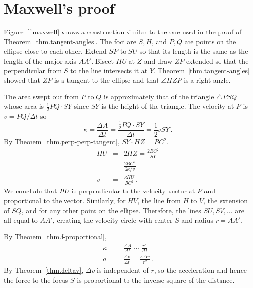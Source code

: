 
\section{Maxwell's proof}

Figure~\ref{f.maxwell} shows a construction similar to the one used in the proof of Theorem~\ref{thm.tangent-angles}. The foci are $S,H$, and $P,Q$ are points on the ellipse close to each other. Extend $SP$ to $SU$ so that its length is the same as the length of the major axis $AA'$. Bisect $HU$ at $Z$ and draw $ZP$ extended so that the perpendicular from $S$ to the line intersects it at $Y$. Theorem~\ref{thm.tangent-angles} showed that $ZP$ is a tangent to the ellipse and that $\angle HZP$ is a right angle.

The area swept out from $P$ to $Q$ is approximately that of the triangle $\triangle PSQ$ whose area is $\frac{1}{2}PQ\cdot SY$ since $SY$ is the height of the triangle. The velocity at $P$ is $v=PQ/\Delta t$ so
\[
\kappa = \frac{\Delta A}{\Delta t} = \frac{\frac{1}{2}PQ\cdot SY}{\Delta t} = \frac{1}{2}v SY\,.
\]
By Theorem~\ref{thm.perp-perp-tangent}, $SY\cdot HZ=BC^2$.
\begin{eqnarray*}
HU&=& 2HZ = \frac{2BC^2}{SY}\\
&=& \frac{2BC^2}{2\kappa/v}\\
v &=& \frac{\kappa HU}{BC^2}\,.
\end{eqnarray*}
We conclude that $HU$ is perpendicular to the velocity vector at $P$ and proportional to the vector. Similarly, for $HV$, the line from $H$ to $V$, the extension of $SQ$, and for any other point on the ellipse. Therefore, the lines $SU, SV, \ldots$ are all equal to $AA'$, creating the velocity  circle with center $S$ and radius $r=AA'$.

By Theorem~\ref{thm.f-proportional}, 
\begin{eqnarray*}
\kappa&=&\frac{\Delta A}{\Delta t} \sim \frac{r^2}{\Delta t}\\
a&=&\frac{\Delta v}{\Delta t}= \frac{\kappa \Delta v}{r^2}\,.
\end{eqnarray*}
By Theorem~\ref{thm.deltav}, $\Delta v$ is independent of $r$, so the acceleration and hence the force to the focus $S$ is proportional to the inverse square of the distance.


